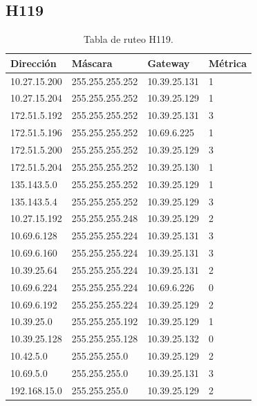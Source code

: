 \documentclass[12pt,titlepage]{article}
\begin{document}
\subsection{H119}
\begin{table}
  \begin{center}
    \begin{tabular}{|l|l|l|l|}
      \hline
        \bf{Direcci\'on} & \bf{M\'ascara} & \bf{Gateway} & \bf{M\'etrica} \\
      \hline 
	10.27.15.200  & 255.255.255.252 & 10.39.25.131 & 1 \\
        10.27.15.204  & 255.255.255.252 & 10.39.25.129 & 1 \\
        172.51.5.192  & 255.255.255.252 & 10.39.25.131 & 3 \\
        172.51.5.196  & 255.255.255.252 & 10.69.6.225 & 1 \\
        172.51.5.200  & 255.255.255.252 & 10.39.25.129 & 3 \\
        172.51.5.204  & 255.255.255.252 & 10.39.25.130 & 1 \\
        135.143.5.0   & 255.255.255.252 & 10.39.25.129 & 1 \\
        135.143.5.4   & 255.255.255.252 & 10.39.25.129 & 3 \\ 	
	10.27.15.192  & 255.255.255.248 & 10.39.25.129 & 2 \\
	10.69.6.128   & 255.255.255.224 & 10.39.25.131 & 3 \\
        10.69.6.160   & 255.255.255.224 & 10.39.25.131 & 3 \\
	10.39.25.64   & 255.255.255.224 & 10.39.25.131 & 2 \\       
	10.69.6.224   & 255.255.255.224 & 10.69.6.226 & 0 \\
	10.69.6.192   & 255.255.255.224 & 10.39.25.129 & 2 \\	
	10.39.25.0    & 255.255.255.192 & 10.39.25.129 & 1 \\
	10.39.25.128  & 255.255.255.128 & 10.39.25.132 & 0 \\
	10.42.5.0     & 255.255.255.0 & 10.39.25.129 & 2 \\
        10.69.5.0     & 255.255.255.0 & 10.39.25.131 & 3 \\
        192.168.15.0  & 255.255.255.0 & 10.39.25.129 & 2 \\  
    \hline
    \end{tabular} \\
  \end{center}
  \caption{Tabla de ruteo H119.}
\end{table}
\FloatBarrier
\end{document}
